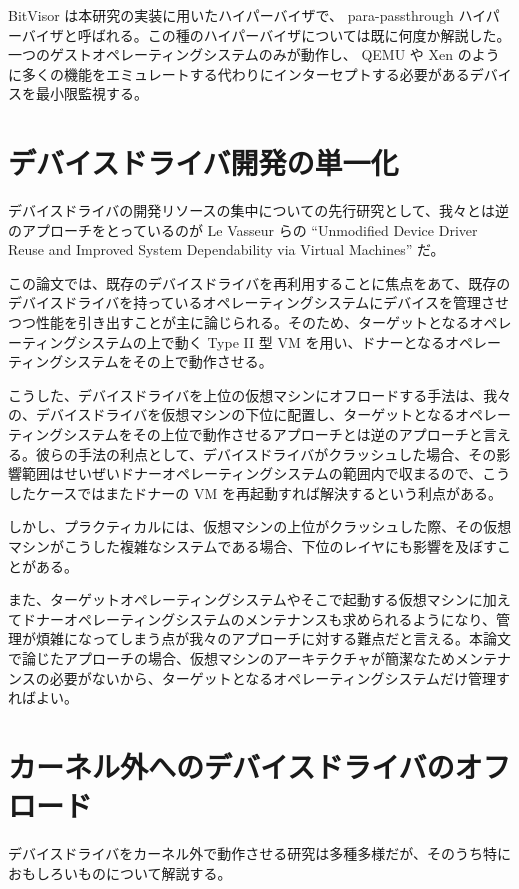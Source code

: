 \documentclass[a4paper,11pt,report]{ltjsbook}
\begin{document}
BitVisor は本研究の実装に用いたハイパーバイザで、 para-passthrough ハイパーバイザと呼ばれる。この種のハイパーバイザについては既に何度か解説した。一つのゲストオペレーティングシステムのみが動作し、 QEMU や Xen のように多くの機能をエミュレートする代わりにインターセプトする必要があるデバイスを最小限監視する。

\section{デバイスドライバ開発の単一化}

デバイスドライバの開発リソースの集中についての先行研究として、我々とは逆のアプローチをとっているのが Le Vasseur らの ``Unmodified Device Driver Reuse and Improved System Dependability via Virtual Machines''\cite{reuse} だ。

この論文では、既存のデバイスドライバを再利用することに焦点をあて、既存のデバイスドライバを持っているオペレーティングシステムにデバイスを管理させつつ性能を引き出すことが主に論じられる。そのため、ターゲットとなるオペレーティングシステムの上で動く Type II 型 VM を用い、ドナーとなるオペレーティングシステムをその上で動作させる。

こうした、デバイスドライバを上位の仮想マシンにオフロードする手法は、我々の、デバイスドライバを仮想マシンの下位に配置し、ターゲットとなるオペレーティングシステムをその上位で動作させるアプローチとは逆のアプローチと言える。彼らの手法の利点として、デバイスドライバがクラッシュした場合、その影響範囲はせいぜいドナーオペレーティングシステムの範囲内で収まるので、こうしたケースではまたドナーの VM を再起動すれば解決するという利点がある。

しかし、プラクティカルには、仮想マシンの上位がクラッシュした際、その仮想マシンがこうした複雑なシステムである場合、下位のレイヤにも影響を及ぼすことがある。

また、ターゲットオペレーティングシステムやそこで起動する仮想マシンに加えてドナーオペレーティングシステムのメンテナンスも求められるようになり、管理が煩雑になってしまう点が我々のアプローチに対する難点だと言える。本論文で論じたアプローチの場合、仮想マシンのアーキテクチャが簡潔なためメンテナンスの必要がないから、ターゲットとなるオペレーティングシステムだけ管理すればよい。

\section{カーネル外へのデバイスドライバのオフロード}

デバイスドライバをカーネル外で動作させる研究は多種多様だが、そのうち特におもしろいものについて解説する。
\end{document}
